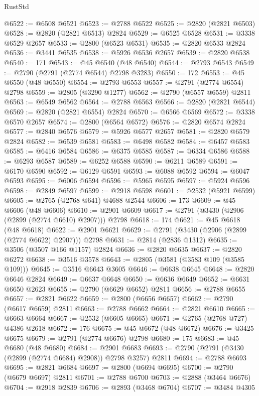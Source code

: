 \begin{lexlean}{RustStd}
\begin{coremodule}
@6522 := @6508 @6521
@6523 := @2788 @6522
@6525 := @2820 (@2821 @6503)
@6528 := @2820 (@2821 @6513) @2824
@6529 := @6525 @6528
@6531 := @3338 @6529 @2657
@6533 := @2800 (@6523 @6531)
@6535 := @2820 @6533 @2824
@6536 := @3441 @6535
@6538 := @5926 @6536 @2657
@6539 := @2820 @6538
@6540 := 171
@6543 := @45 @6540 (@48 @6540)
@6544 := @2793 @6543
@6549 := @2790 (@2791 (@2774 @6544) @2798 @3283)
@6550 := 172
@6553 := @45 @6550 (@48 @6550)
@6554 := @2793 @6553
@6557 := @2791 (@2774 @6554) @2798
@6559 := @2805 (@3290 @1277)
@6562 := @2790 (@6557 @6559) @2811
@6563 := @6549 @6562
@6564 := @2788 @6563
@6566 := @2820 (@2821 @6544)
@6569 := @2820 (@2821 @6554) @2824
@6570 := @6566 @6569
@6572 := @3338 @6570 @2657
@6574 := @2800 (@6564 @6572)
@6576 := @2820 @6574 @2824
@6577 := @2840 @6576
@6579 := @5926 @6577 @2657
@6581 := @2820 @6579 @2824
@6582 := @6539 @6581
@6583 := @6498 @6582
@6584 := @6457 @6583
@6585 := @6416 @6584
@6586 := @6375 @6585
@6587 := @6334 @6586
@6588 := @6293 @6587
@6589 := @6252 @6588
@6590 := @6211 @6589
@6591 := @6170 @6590
@6592 := @6129 @6591
@6593 := @6088 @6592
@6594 := @6047 @6593
@6595 := @6006 @6594
@6596 := @5965 @6595
@6597 := @5924 @6596
@6598 := @2849 @6597
@6599 := @2918 @6598
@6601 := @2532 (@5921 @6599)
@6605 := @2765 (@2768 @641) @4688 @2544
@6606 := 173
@6609 := @45 @6606 (@48 @6606)
@6610 := @2901 @6609
@6617 := @2791 (@3430 (@2906 (@2899 (@2774 @6610) @2907))) @2798
@6618 := 174
@6621 := @45 @6618 (@48 @6618)
@6622 := @2901 @6621
@6629 := @2791 (@3430 (@2906 (@2899 (@2774 @6622) @2907))) @2798
@6631 := @2814 (@2836 @1312)
@6635 := @3506 (@3507 @166 @1157) @2824
@6636 := @2820 @6635
@6637 := @2820 @6272
@6638 := @3516 @3578
@6643 := @2805 (@3581 (@3583 @109 (@3585 @109)))
@6645 := @3516 @6643 @3605
@6646 := @6638 @6645
@6648 := @2820 @6646 @2824
@6649 := @6637 @6648
@6650 := @6636 @6649
@6652 := @6631 @6650 @2623
@6655 := @2790 (@6629 @6652) @2811
@6656 := @2788 @6655
@6657 := @2821 @6622
@6659 := @2800 (@6656 @6657)
@6662 := @2790 (@6617 @6659) @2811
@6663 := @2788 @6662
@6664 := @2821 @6610
@6665 := @6663 @6664
@6667 := @2532 (@6605 @6665)
@6671 := @2765 (@2768 @727) @4386 @2618
@6672 := 176
@6675 := @45 @6672 (@48 @6672)
@6676 := @3425 @6675
@6679 := @2791 (@2774 @6676) @2798
@6680 := 175
@6683 := @45 @6680 (@48 @6680)
@6684 := @2901 @6683
@6693 := @2790 (@2791 (@3430 (@2899 (@2774 @6684) @2908)) @2798 @3257) @2811
@6694 := @2788 @6693
@6695 := @2821 @6684
@6697 := @2800 (@6694 @6695)
@6700 := @2790 (@6679 @6697) @2811
@6701 := @2788 @6700
@6703 := @2888 (@3464 @6676)
@6704 := @2918 @2839
@6706 := @2893 (@3468 @6704)
@6707 := @3484 @4305

\end{coremodule}
\end{lexlean}
